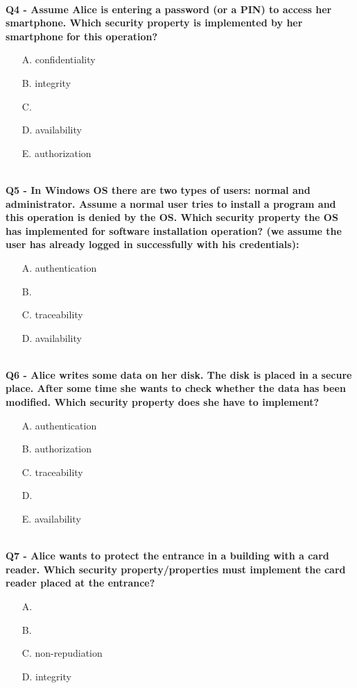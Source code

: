 
\textbf{\\Q4 - Assume Alice is entering a password (or a PIN) to access her smartphone. Which security property is implemented by her smartphone for this operation?}
\begin{enumerate}
    \item[A.] confidentiality
    \item[B.] integrity
    \item[C.] 
    \item[D.] availability
    \item[E.] authorization
\end{enumerate}


\textbf{\\Q5 - In Windows OS there are two types of users: normal and administrator. Assume a normal user tries to install a program and this operation is denied by the OS. Which security property the OS has implemented for software installation operation? (we assume the user has already logged in successfully with his credentials):}
\begin{enumerate}
    \item[A.] authentication
    \item[B.] 
    \item[C.] traceability
    \item[D.] availability
\end{enumerate}



\textbf{\\Q6 - Alice writes some data on her disk. The disk is placed in a secure place. After some time she wants to check whether the data has been modified. Which security property does she have to implement?}
\begin{enumerate}
    \item[A.] authentication
    \item[B.] authorization
    \item[C.] traceability
    \item[D.] 
    \item[E.] availability
\end{enumerate}

\textbf{\\Q7 - Alice wants to protect the entrance in a building with a card reader. Which security property/properties must implement the card reader placed at the entrance?}
\begin{enumerate}
    \item[A.] 
    \item[B.] 
    \item[C.] non-repudiation
    \item[D.] integrity
\end{enumerate}

